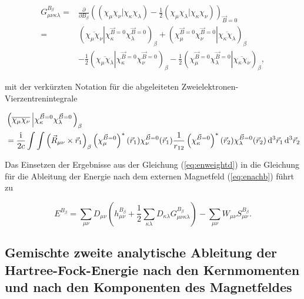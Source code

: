   	 \begin{equation}
  	 \begin{aligned}
  	 G_{\mu\nu\kappa\lambda}^{B_\beta}=&\frac{\partial}{\partial B_\beta}\left((\chi_\mu\chi_\nu\vert\chi_\kappa\chi_\lambda)-\frac{1}{2}(\chi_\mu\chi_\lambda\vert\chi_\kappa\chi_\nu)\right)_{\vec{B}=0}\\
  	 =&\left(\overline{\chi_\mu\chi_\nu}\left\vert\chi_\kappa^{\vec{B}=0}\chi_\lambda^{\vec{B}=0}\right.\right)_\beta
  	 +\left(\left.\chi_\mu^{\vec{B}=0}\chi_\nu^{\vec{B}=0}\right\vert\overline{\chi_\kappa\chi_\lambda}\right)_\beta\\
  	 &-\frac{1}{2}\left(\overline{\chi_\mu\chi_\lambda}\left\vert\chi_\kappa^{\vec{B}=0}\chi_\nu^{\vec{B}=0}\right.\right)_\beta
  	 -\frac{1}{2}\left(\left.\chi_\mu^{\vec{B}=0}\chi_\lambda^{\vec{B}=0}\right\vert\overline{\chi_\kappa\chi_\nu}\right)_\beta,
  	 \end{aligned}
     \end{equation}  	  
	
	mit der verkürzten Notation für die abgeleiteten Zweielektronen-Vierzentrenintegrale
	
	\begin{equation}
	\begin{aligned}
	&\left(\overline{\chi_\mu\chi_\nu}\left\vert\chi_\kappa^{\vec{B}=0}\chi_\lambda^{\vec{B}=0}\right.\right)_\beta\\
	&=\frac{\mathrm{i}\mkern1mu}{2c}\int\int\left(\vec{R}_{\mu\nu}\times\vec{r}_1\right)_\beta\left(\chi_\mu^{\vec{B}=0}\right)^*(\vec{r}_1)\chi_\nu^{\vec{B}=0}(\vec{r}_1)\frac{1}{r_{12}}\left(\chi_\kappa^{\vec{B}=0}\right)^*(\vec{r}_2)\chi_\lambda^{\vec{B}=0}(\vec{r}_2)\mathop{}\!\mathrm{d^3} \vec{r}_1 \mathop{}\!\mathrm{d^3} \vec{r}_2\\
	\end{aligned}
	\end{equation}
     
    Das Einsetzen der Ergebnisse aus der Gleichung (\ref{eq:enweightd}) in die Gleichung für die Ableitung der Energie nach dem externen Magnetfeld (\ref{eq:enachb}) führt zu
    
    \begin{equation}
    E^{B_\beta}=\sum_{\mu\nu}D_{\mu\nu}\left(h_{\mu\nu}^{B_\beta}+\frac{1}{2}\sum_{\kappa\lambda}D_{\kappa\lambda}G_{\mu\nu\kappa\lambda}^{B_\beta}\right)-\sum_{\mu\nu}W_{\mu\nu}S_{\mu\nu}^{B_\beta}.
    \end{equation}
    
\subsection{Gemischte zweite analytische Ableitung der Hartree-Fock-Energie nach den Kernmomenten und nach den Komponenten des Magnetfeldes}    

